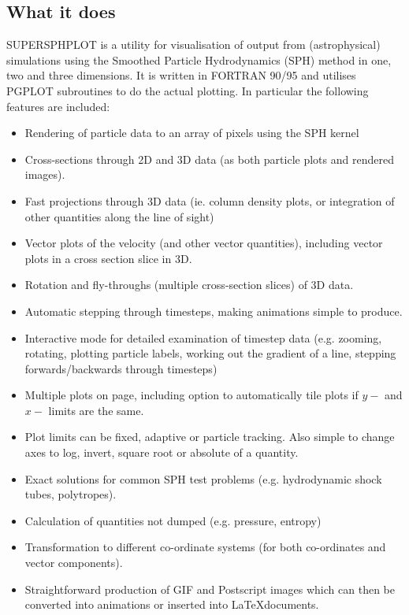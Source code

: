 \documentclass[a4paper,12pt]{article}
\begin{document}
\subsection{What it does}
SUPERSPHPLOT is a utility for visualisation of output from (astrophysical) simulations using the
Smoothed Particle Hydrodynamics (SPH) method in one, two and three dimensions.
It is written in FORTRAN 90/95 and
utilises PGPLOT subroutines to do the actual plotting. In particular the following
features are included:
\begin{itemize}
\item Rendering of particle data to an array of pixels using the SPH kernel
\item Cross-sections through 2D and 3D data (as both particle plots and rendered
images).
\item Fast projections through 3D data (ie. column density plots, or integration of
other quantities along the line of sight)
\item Vector plots of the velocity (and other vector quantities), including vector
plots in a cross section slice in 3D.
\item Rotation and fly-throughs (multiple cross-section slices) of 3D data.
\item Automatic stepping through timesteps, making animations simple to produce.
\item Interactive mode for detailed examination of timestep data (e.g. zooming,
rotating, plotting particle labels, working out the gradient of a line, stepping forwards/backwards
through timesteps)
\item Multiple plots on page, including option to automatically tile plots if $y-$ and $x-$ limits
are the same.
\item Plot limits can be fixed, adaptive or particle tracking. Also simple to change
axes to log, invert, square root or absolute of a quantity.
\item Exact solutions for common SPH test problems (e.g. hydrodynamic shock tubes,
polytropes).
\item Calculation of quantities not dumped (e.g. pressure, entropy)
\item Transformation to different co-ordinate systems (for both co-ordinates and
vector components).
\item Straightforward production of GIF and Postscript images which can then be
converted into animations or inserted into \LaTeX documents.
\end{itemize}
\end{document}
